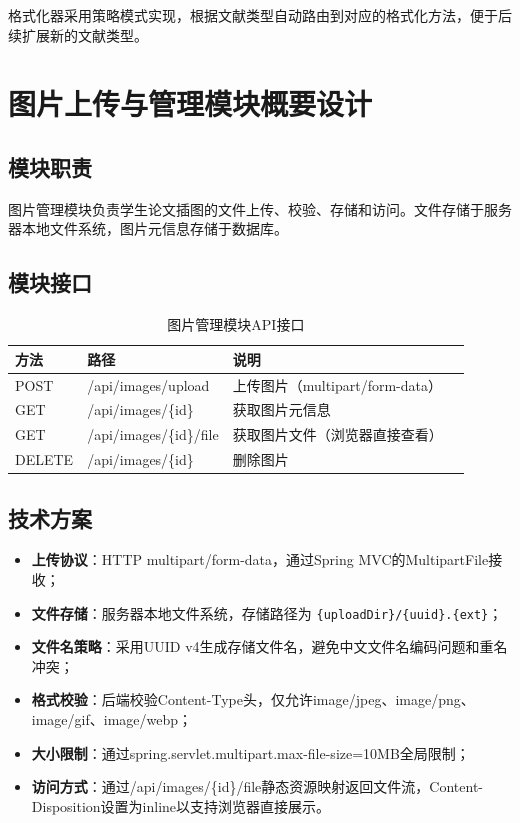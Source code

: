 \documentclass{../../softeng}
\begin{document}
格式化器采用策略模式实现，根据文献类型自动路由到对应的格式化方法，便于后续扩展新的文献类型。

\section{图片上传与管理模块概要设计}

\subsection{模块职责}

图片管理模块负责学生论文插图的文件上传、校验、存储和访问。文件存储于服务器本地文件系统，图片元信息存储于数据库。

\subsection{模块接口}

\begin{table}[htbp]
\centering
\caption{图片管理模块API接口}
\label{tab:img_api}
\begin{tabular}{lllp{5cm}}
\toprule
\textbf{方法} & \textbf{路径} & \textbf{说明} \\
\midrule
POST   & /api/images/upload       & 上传图片（multipart/form-data） \\
GET    & /api/images/\{id\}        & 获取图片元信息 \\
GET    & /api/images/\{id\}/file   & 获取图片文件（浏览器直接查看） \\
DELETE & /api/images/\{id\}        & 删除图片 \\
\bottomrule
\end{tabular}
\end{table}

\subsection{技术方案}

\begin{itemize}
    \item \textbf{上传协议}：HTTP multipart/form-data，通过Spring MVC的MultipartFile接收；
    \item \textbf{文件存储}：服务器本地文件系统，存储路径为 \verb|{uploadDir}/{uuid}.{ext}|；
    \item \textbf{文件名策略}：采用UUID v4生成存储文件名，避免中文文件名编码问题和重名冲突；
    \item \textbf{格式校验}：后端校验Content-Type头，仅允许image/jpeg、image/png、image/gif、image/webp；
    \item \textbf{大小限制}：通过spring.servlet.multipart.max-file-size=10MB全局限制；
    \item \textbf{访问方式}：通过/api/images/\{id\}/file静态资源映射返回文件流，Content-Disposition设置为inline以支持浏览器直接展示。
\end{itemize}
\end{document}
